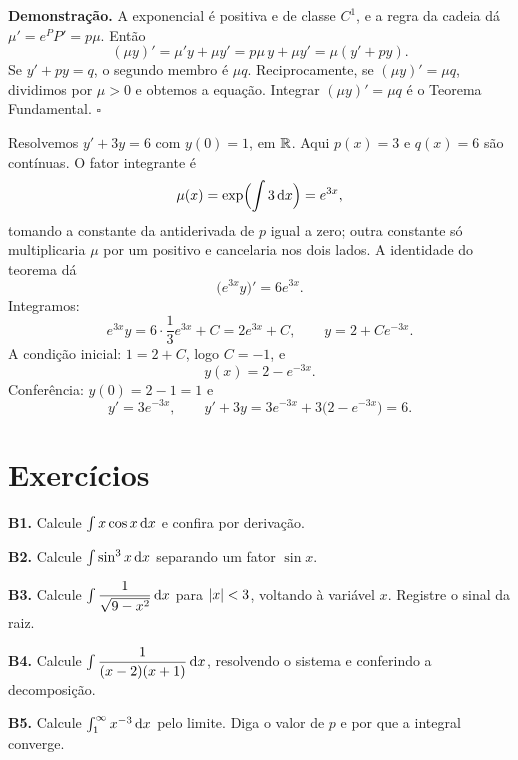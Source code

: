 \documentclass[11pt,a4paper]{article}
\begin{document}
\noindent\textbf{Demonstração.}
A exponencial é positiva e de classe \(C^1\), e a regra da cadeia dá \(\mu'=e^{P}P'=p\mu\). Então
\[
(\mu y)'=\mu'y+\mu y'=p\mu\, y+\mu y'=\mu(y'+py).
\]
Se \(y'+py=q\), o segundo membro é \(\mu q\). Reciprocamente, se \((\mu y)'=\mu q\), dividimos por \(\mu>0\) e obtemos a equação. Integrar \((\mu y)'=\mu q\) é o Teorema Fundamental.
\hfill\(\square\)

\begin{exemplo}
Resolvemos \(y'+3y=6\) com \(y(0)=1\), em \(\mathbb{R}\). Aqui \(p(x)=3\) e \(q(x)=6\) são contínuas. O fator integrante é
\[
\mu(x)=\exp\Bigl(\int 3\,\mathrm{d} x\Bigr)=e^{3x},
\]
tomando a constante da antiderivada de \(p\) igual a zero; outra constante só multiplicaria \(\mu\) por um positivo e cancelaria nos dois lados. A identidade do teorema dá
\[
\bigl(e^{3x} y\bigr)'=6e^{3x}.
\]
Integramos:
\[
e^{3x} y=6\cdot\frac{1}{3}e^{3x}+C=2e^{3x}+C,
\qquad
y=2+Ce^{-3x}.
\]
A condição inicial: \(1=2+C\), logo \(C=-1\), e
\[
y(x)=2-e^{-3x}.
\]
Conferência: \(y(0)=2-1=1\) e
\[
y'=3e^{-3x},\qquad
y'+3y=3e^{-3x}+3\bigl(2-e^{-3x}\bigr)=6.
\]
\end{exemplo}

\section{Exercícios}

\begin{exercicio}
\textbf{B1.} Calcule \(\int x\cos x\,\mathrm{d} x\) e confira por derivação.
\end{exercicio}

\begin{exercicio}
\textbf{B2.} Calcule \(\int\sin^{3}x\,\mathrm{d} x\) separando um fator \(\sin x\).
\end{exercicio}

\begin{exercicio}
\textbf{B3.} Calcule \(\int\dfrac{1}{\sqrt{9-x^{2}}}\,\mathrm{d} x\) para \(\left\lvert x \right\rvert<3\), voltando à variável \(x\). Registre o sinal da raiz.
\end{exercicio}

\begin{exercicio}
\textbf{B4.} Calcule \(\int\dfrac{1}{(x-2)(x+1)}\,\mathrm{d} x\), resolvendo o sistema e conferindo a decomposição.
\end{exercicio}

\begin{exercicio}
\textbf{B5.} Calcule \(\int_1^{\infty} x^{-3}\,\mathrm{d} x\) pelo limite. Diga o valor de \(p\) e por que a integral converge.
\end{exercicio}
\end{document}
